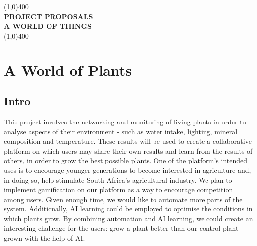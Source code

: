 \documentclass{article}
\begin{document}
\begin{titlepage}
	\begin{center}
		\line(1,0){400}\\
		[6mm]
		\huge{\bfseries PROJECT PROPOSALS\\A WORLD OF THINGS}\\
		\line(1,0){400}\\
	\end{center}
\end{titlepage}

\section{A World of Plants}
	\subsection{Intro}
		This project involves the networking and monitoring of living plants in order to analyse aspects of their environment - such as water intake, lighting, mineral composition and temperature. These results will be used to create a collaborative platform on which users may share their own results and learn from the results of others, in order to grow the best possible plants. One of the platform's intended uses is to encourage younger generations to become interested in agriculture and, in doing so, help stimulate South Africa's agricultural industry. We plan to implement gamification on our platform as a way to encourage competition among users. Given enough time, we would like to automate more parts of the system. Additionally, AI learning could be employed to optimise the conditions in which plants grow. By combining automation and AI learning, we could create an interesting challenge for the users: grow a plant better than our control plant grown with the help of AI.
\end{document}
